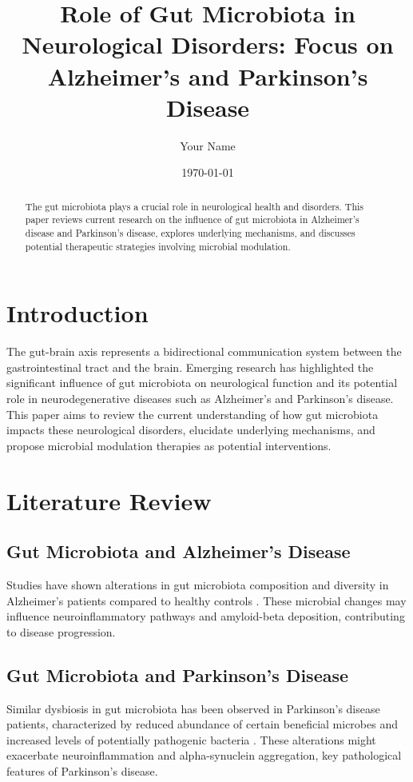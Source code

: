 \documentclass[12pt]{article}
\title{Role of Gut Microbiota in Neurological Disorders: Focus on Alzheimer's and Parkinson's Disease}
\author{Your Name}
\date{\today}
\begin{document}
\maketitle

\begin{abstract}
The gut microbiota plays a crucial role in neurological health and disorders. This paper reviews current research on the influence of gut microbiota in Alzheimer's disease and Parkinson's disease, explores underlying mechanisms, and discusses potential therapeutic strategies involving microbial modulation.
\end{abstract}

\section{Introduction}
The gut-brain axis represents a bidirectional communication system between the gastrointestinal tract and the brain. Emerging research has highlighted the significant influence of gut microbiota on neurological function and its potential role in neurodegenerative diseases such as Alzheimer's and Parkinson's disease. This paper aims to review the current understanding of how gut microbiota impacts these neurological disorders, elucidate underlying mechanisms, and propose microbial modulation therapies as potential interventions.

\section{Literature Review}
\subsection{Gut Microbiota and Alzheimer's Disease}
Studies have shown alterations in gut microbiota composition and diversity in Alzheimer's patients compared to healthy controls \citep{cattaneo2017gut, haran2019alzheimer}. These microbial changes may influence neuroinflammatory pathways and amyloid-beta deposition, contributing to disease progression.

\subsection{Gut Microbiota and Parkinson's Disease}
Similar dysbiosis in gut microbiota has been observed in Parkinson's disease patients, characterized by reduced abundance of certain beneficial microbes and increased levels of potentially pathogenic bacteria \citep{sampson2016gut, hasegawa2020intestinal}. These alterations might exacerbate neuroinflammation and alpha-synuclein aggregation, key pathological features of Parkinson's disease.
\end{document}
